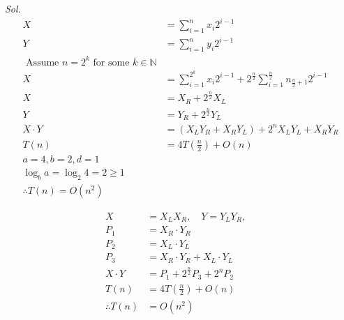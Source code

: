 \pagebreak

\textit{ Sol. }
\begin{align*}
	X         & = \sum_{i=1}^{n} x_i 2^{i-1}                                                                        \\
	Y         & = \sum_{i=1}^{n} y_i 2^{i-1}                                                                        \\
	\text{ Assume } n = 2^k \text{ for some } k \in \mathbb{N}                                                      \\
	X         & = \sum_{i=1}^{2^k} x_i 2^{i-1} + 2^{\frac{n}{2}} \sum_{i=1}^{\frac{n}{2}} n_{\frac{n}{2}+1} 2^{i-1} \\
	X         & = X_R + 2^{\frac{n}{2}} X_L                                                                         \\
	Y         & = Y_R + 2^{\frac{n}{2}} Y_L                                                                         \\
	X \cdot Y & = (X_L Y_R + X_R Y_L) + 2^n X_L Y_L + X_R Y_R                                                       \\
	T(n)      & = 4T\left(\frac{n}{2}\right) + O(n)                                                                 \\
	a = 4, b = 2, d = 1                                                                                             \\
	\log_b a = \log_2 4 = 2 \geq 1                                                                                  \\
	\therefore T(n) = O(n^2)
\end{align*}

\pagebreak


\begin{align*}
	X               & = X_L  X_R, \quad Y = Y_L  Y_R, \quad \\
	P_1             & = X_R \cdot Y_R                       \\
	P_2             & = X_L \cdot Y_L                       \\
	P_3             & = X_R \cdot Y_R + X_L \cdot Y_L       \\
	X \cdot Y       & = P_1 + 2^{\frac{n}{2}}P_3 + 2^n P_2  \\
	T(n)            & = 4T\left(\frac{n}{2}\right) + O(n)   \\
	\therefore T(n) & = O(n^2)
\end{align*}


